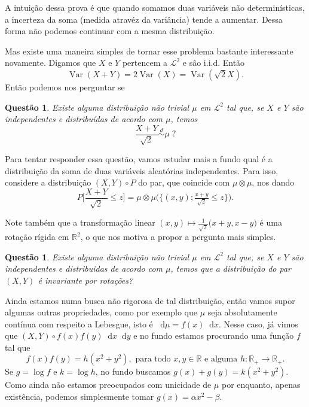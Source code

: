 \documentclass[reqno]{article}
\newcommand*\1{\mathds{1}}
\newtheorem{question}[theorem]{Questão}
\DeclareMathOperator{\Var}{Var}
\def \distr {\overset{d}{\sim}}
\renewcommand*\d{\mathop{}\!\mathrm{d}}
\begin{document}
A intuição dessa prova é que quando somamos duas variáveis não determinísticas, a incerteza da soma (medida atravéz da variância) tende a aumentar.
Dessa forma não podemos continuar com a mesma distribuição.

Mas existe uma maneira simples de tornar esse problema bastante interessante novamente.
Digamos que $X$ e $Y$ pertencem a $\mathcal{L}^2$ e são i.i.d.
Então
\begin{equation}
  \Var(X + Y) = 2 \Var(X) = \Var(\sqrt{2} X).
\end{equation}
Então podemos nos perguntar se

\begin{question}
  \label{q:ponto_fixo_soma}
  Existe alguma distribuição não trivial $\mu$ em $\mathcal{L}^2$ tal que, se $X$ e $Y$ são independentes e distribuídas de acordo com $\mu$, temos
  \begin{equation}
    \frac{X + Y}{\sqrt{2}} \distr \mu \; ?
  \end{equation}
\end{question}

Para tentar responder essa questão, vamos estudar mais a fundo qual é a distribuição da soma de duas variáveis aleatórias independentes.
Para isso, considere a distribuição $(X,Y) \circ P$ do par, que coincide com $\mu \otimes \mu$, nos dando
\begin{equation}
  P\Big[ \frac{X + Y}{\sqrt{2}} \leq z \Big] = \mu \otimes \mu \big( \big\{(x, y); \tfrac{x + y}{\sqrt{2}} \leq z \big\} \big).
\end{equation}

Note também que a transformação linear $(x,y) \mapsto \tfrac{1}{\sqrt{2}}\big(x + y, x - y\big)$ é uma rotação rígida em $\mathbb{R}^2$, o que nos motiva a propor a pergunta mais simples.

\begin{question}
  Existe alguma distribuição não trivial $\mu$ em $\mathcal{L}^2$ tal que, se $X$ e $Y$ são independentes e distribuídas de acordo com $\mu$, temos que a distribuição do par $(X,Y)$ é invariante por rotações?
\end{question}

Ainda estamos numa busca não rigorosa de tal distribuição, então vamos supor algumas outras propriedades, como por exemplo que $\mu$ seja absolutamente contínua com respeito a Lebesgue, isto é $\d \mu = f(x) \d x$.
Nesse caso, já vimos que $(X, Y) \circ f(x) f(y) \d x \d y$ e no fundo estamos procurando uma função $f$ tal que
\begin{equation}
  f(x) f(y) = h(x^2 + y^2), \text{ para todo $x, y \in \mathbb{R}$ e alguma $h: \mathbb{R}_+ \to \mathbb{R}_+$.}
\end{equation}
Se $g = \log f$ e $k = \log h$, no fundo buscamos $g(x) + g(y) = k(x^2 + y^2)$.
Como ainda não estamos preocupados com unicidade de $\mu$ por enquanto, apenas existência, podemos simplesmente tomar $g(x) = \alpha x^2 - \beta$.
\end{document}
